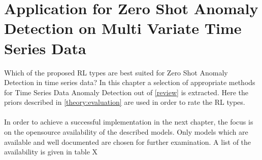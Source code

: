 \section{Application for Zero Shot Anomaly Detection on Multi Variate Time Series Data}\label{application}
 Which of the proposed RL types are best suited for Zero Shot Anomaly Detection in time series data? In this chapter a selection of appropriate methods for Time Series Data Anomaly Detection out of \ref{review} is extracted. Here the priors described in \ref{theory:evaluation} are used in order to rate the RL types.\\\\
 In order to achieve a successful implementation in the next chapter, the focus is on the opensource availability of the described models. Only models which are available and well documented are chosen for further examination. A list of the availability is given in table X\\\\

\cite{fung_model_2024} \\\\ %
